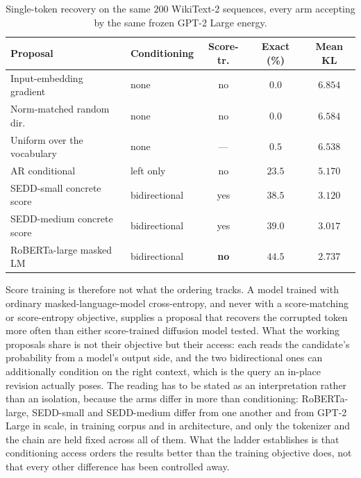 \begin{table}[htbp]
    \centering
    \small
    \setlength{\tabcolsep}{4pt}
    \begin{tabular}{llccc}
        \toprule
        Proposal & Conditioning & Score-tr. & Exact (\%) & Mean KL \\
        \midrule
        Input-embedding gradient      & none          & no  & $0.0$          & $6.854$ \\
        Norm-matched random dir.\      & none          & no  & $0.0$          & $6.584$ \\
        Uniform over the vocabulary   & none          & --- & $0.5$          & $6.538$ \\
        AR conditional                & left only     & no  & $23.5$         & $5.170$ \\
        SEDD-small concrete score     & bidirectional & yes & $38.5$         & $3.120$ \\
        SEDD-medium concrete score    & bidirectional & yes & $39.0$         & $3.017$ \\
        RoBERTa-large masked LM       & bidirectional & \textbf{no} & $\mathbf{44.5}$ & $\mathbf{2.737}$ \\
        \bottomrule
    \end{tabular}
    \caption[Proposals accepted by the same exact energy, ordered by conditioning.]{Single-token recovery on the same $200$ WikiText-2 sequences, every arm accepting by the same frozen GPT-2 Large energy.}
    \label{tab:mlm}
\end{table}

Score training is therefore not what the ordering tracks. A model trained with ordinary masked-language-model cross-entropy, and never with a score-matching or score-entropy objective, supplies a proposal that recovers the corrupted token more often than either score-trained diffusion model tested. What the working proposals share is not their objective but their access: each reads the candidate's probability from a model's output side, and the two bidirectional ones can additionally condition on the right context, which is the query an in-place revision actually poses. The reading has to be stated as an interpretation rather than an isolation, because the arms differ in more than conditioning: RoBERTa-large, SEDD-small and SEDD-medium differ from one another and from GPT-2 Large in scale, in training corpus and in architecture, and only the tokenizer and the chain are held fixed across all of them. What the ladder establishes is that conditioning access orders the results better than the training objective does, not that every other difference has been controlled away.

